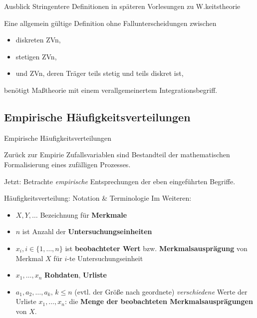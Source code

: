 \documentclass[
  10pt,
  ignorenonframetext,
]{beamer}
\providecommand{\tightlist}{%
  \setlength{\itemsep}{0pt}\setlength{\parskip}{0pt}}
\begin{document}
\begin{frame}{Ausblick}
\label{ausblick}
Stringentere Definitionen in späteren Vorlesungen zu W.keitstheorie ~

Eine allgemein gültige Definition ohne Fallunterscheidungen zwischen

\begin{itemize}
\tightlist
\item
  diskreten ZVn,
\item
  stetigen ZVn,
\item
  und ZVn, deren Träger teils stetig und teils diskret ist,
\end{itemize}

benötigt Maßtheorie mit einem verallgemeinertem Integrationsbegriff.
\end{frame}

\subsection{Empirische
Häufigkeitsverteilungen}\label{empirische-huxe4ufigkeitsverteilungen}

\begin{frame}{Empirische Häufigkeitsverteilungen}
\end{frame}

\begin{frame}{Zurück zur Empirie}
\label{zuruxfcck-zur-empirie}
Zufallsvariablen sind Bestandteil der mathematischen Formalisierung
eines zufälligen Prozesses.

Jetzt: Betrachte \emph{empirische} Entsprechungen der eben eingeführten
Begriffe.
\end{frame}

\begin{frame}{Häufigkeitsverteilung: Notation \& Terminologie}
\label{huxe4ufigkeitsverteilung-notation-terminologie}
Im Weiteren:

\begin{itemize}
\tightlist
\item
  \(X, Y, \ldots\) Bezeichnung für \textbf{Merkmale}
\item
  \(n\) ist Anzahl der \textbf{Untersuchungseinheiten}
\item
  \(x_i, i \in \{1, \ldots, n\}\) ist \textbf{beobachteter Wert} bzw.
  \textbf{Merkmalsausprägung} von Merkmal \(X\) für \(i\)-te
  Untersuchungseinheit
\item
  \(x_1, \ldots, x_n\) \textbf{Rohdaten}, \textbf{Urliste}
\item
  \(a_1, a_2, \ldots, a_k, \, k \le n\) (evtl. der Größe nach geordnete)
  \emph{verschiedene} Werte der Urliste \(x_1,\ldots,x_n\): die
  \textbf{Menge der beobachteten Merkmalsausprägungen} von \(X\).
\end{itemize}
\end{frame}
\end{document}
